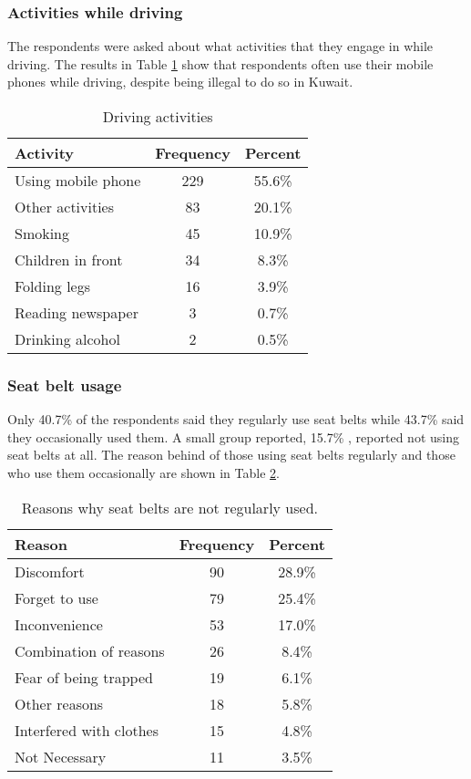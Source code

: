 \documentclass[preprint,12pt,a4paper,authoryear]{elsarticle}
\begin{document}
\subsubsection{Activities while driving}
The respondents were asked about what activities that they engage in while driving. The results in Table \ref{tab:activities} show that respondents often use their mobile phones while driving, despite being illegal to do so in Kuwait.

\begin{table}[H]
\centering
\caption{Driving activities}
\label{tab:activities}
\begin{tabular}{@{}lcc@{}}
\toprule
\textbf{Activity} & \textbf{Frequency} & \textbf{Percent} \\ \midrule
Using mobile phone & 229 & 55.6\% \\
Other activities & 83 & 20.1\% \\
Smoking & 45 & 10.9\% \\
Children in front & 34 & 8.3\% \\
Folding legs & 16 & 3.9\% \\
Reading newspaper & 3 & 0.7\% \\
Drinking alcohol & 2 & 0.5\% \\ \bottomrule
\end{tabular}
\end{table}

\subsubsection{Seat belt usage}
Only 40.7\% of the respondents said they regularly use seat belts while 43.7\% said they occasionally used them. A small group reported, 15.7\% , reported not using seat belts at all. The reason behind of those using seat belts regularly  and those who use them occasionally  are shown in Table \ref{tab:excuses}. 

\begin{table}[H]
\centering
\caption{Reasons why seat belts are not regularly used.}
\label{tab:excuses}
\begin{tabular}{@{}lcc@{}}
\toprule
\textbf{Reason} & \textbf{Frequency} & \textbf{Percent} \\ \midrule
Discomfort & 90 & 28.9\% \\
Forget to use & 79 & 25.4\% \\
Inconvenience & 53 & 17.0\% \\
Combination of reasons & 26 & 8.4\% \\
Fear of being trapped & 19 & 6.1\% \\
Other reasons & 18 & 5.8\% \\
Interfered with clothes & 15 & 4.8\% \\
Not Necessary & 11 & 3.5\% \\ \bottomrule
\end{tabular}
\end{table}
\end{document}
